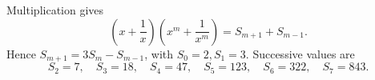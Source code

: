 Multiplication gives
\[\left(x+\dfrac{1}{x}\right)\left(x^m+\dfrac{1}{x^m}\right)=S_{m+1}+S_{m-1}.\]
Hence $S_{m+1}=3S_m-S_{m-1}$, with $S_0=2,S_1=3$. Successive values are
\[S_2=7,\quad S_3=18,\quad S_4=47,\quad S_5=123,\quad S_6=322,\quad S_7=\boxed{843}.\]
